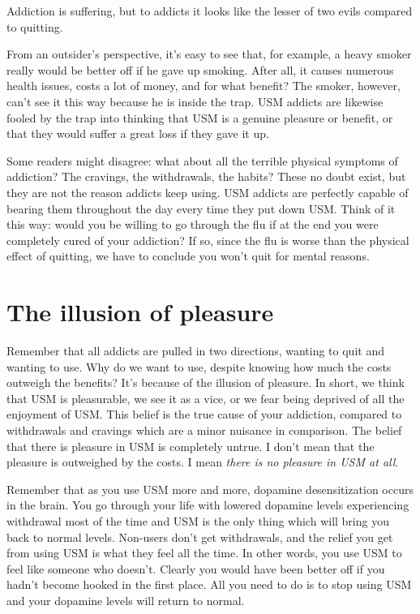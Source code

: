 \documentclass[
  openany]{book}
\newenvironment{rmdnote}{
\color{blue}
\begin{framed}}{\end{framed}}
\begin{document}
\begin{rmdnote}
Addiction is suffering, but to addicts it looks like the lesser of two evils compared to quitting.

\end{rmdnote}

From an outsider's perspective, it's easy to see that, for example, a heavy smoker really would be better off if he gave up smoking. After all, it causes numerous health issues, costs a lot of money, and for what benefit? The smoker, however, can't see it this way because he is inside the trap. USM addicts are likewise fooled by the trap into thinking that USM is a genuine pleasure or benefit, or that they would suffer a great loss if they gave it up.

Some readers might disagree: what about all the terrible physical symptoms of addiction? The cravings, the withdrawals, the habits? These no doubt exist, but they are not the reason addicts keep using. USM addicts are perfectly capable of bearing them throughout the day every time they put down USM. Think of it this way: would you be willing to go through the flu if at the end you were completely cured of your addiction? If so, since the flu is worse than the physical effect of quitting, we have to conclude you won't quit for mental reasons.

\section{The illusion of pleasure}\label{the-illusion-of-pleasure}

Remember that all addicts are pulled in two directions, wanting to quit and wanting to use. Why do we want to use, despite knowing how much the costs outweigh the benefits? It's because of the illusion of pleasure. In short, we think that USM is pleasurable, we see it as a vice, or we fear being deprived of all the enjoyment of USM. This belief is the true cause of your addiction, compared to withdrawals and cravings which are a minor nuisance in comparison. The belief that there is pleasure in USM is completely untrue. I don't mean that the pleasure is outweighed by the costs. I mean \emph{there is no pleasure in USM at all}.

Remember that as you use USM more and more, dopamine desensitization occurs in the brain. You go through your life with lowered dopamine levels experiencing withdrawal most of the time and USM is the only thing which will bring you back to normal levels. Non-users don't get withdrawals, and the relief you get from using USM is what they feel all the time. In other words, you use USM to feel like someone who doesn't. Clearly you would have been better off if you hadn't become hooked in the first place. All you need to do is to stop using USM and your dopamine levels will return to normal.
\end{document}

